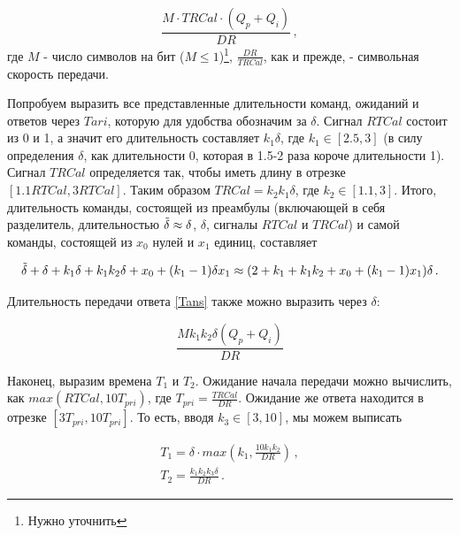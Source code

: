 \documentclass[12pt]{article}
\theoremstyle{definition}
\begin{document}
\begin{equation}
\label{Tans}
    \frac{M\cdot TRCal\cdot(Q_p+Q_i)}{DR}\,,
\end{equation}
где $M$ - число символов на бит ($M\leq1$)\footnote{Нужно уточнить}, $\frac{DR}{TRCal}$, как и прежде, - символьная скорость передачи.

Попробуем выразить все представленные длительности команд, ожиданий и ответов через $Tari$, которую для удобства обозначим за $\delta$. Сигнал $RTCal$ состоит из 0 и 1, а значит его длительность составляет $k_1\delta$, где $k_1\in[2.5,3]$ (в силу определения $\delta$, как длительности 0, которая в 1.5-2 раза короче длительности 1). Сигнал $TRCal$ определяется так, чтобы иметь длину в отрезке $[1.1RTCal,3RTCal]$. Таким образом $TRCal = k_2k_1\delta$, где $k_2\in[1.1,3]$. Итого, длительность команды, состоящей из преамбулы (включающей в себя разделитель, длительностью $\Tilde{\delta}\approx\delta$, $\delta$, сигналы $RTCal$ и $TRCal$) и самой команды, состоящей из $x_0$ нулей и $x_1$ единиц, составляет

\begin{equation}
    \Tilde{\delta}+\delta+k_1\delta+k_1k_2\delta+x_0+(k_1-1)\delta x_1 \approx (2+k_1+k_1k_2+x_0+(k_1-1)x_1)\delta\,.
\end{equation}

Длительность передачи ответа \eqref{Tans} также можно выразить через $\delta$:

\begin{equation}
    \frac{Mk_1k_2\delta(Q_p+Q_i)}{DR}
\end{equation}

Наконец, выразим времена $T_1$ и $T_2$. Ожидание начала передачи можно вычислить, как $max(RTCal,10T_{pri})$, где $T_{pri}=\frac{TRCal}{DR}$. Ожидание же ответа находится в отрезке $[3T_{pri},10T_{pri}]$. То есть, вводя $k_3\in[3,10]$, мы можем выписать

\begin{equation}
    \begin{gathered}
        T_1 = \delta\cdot max(k_1,\frac{10k_1k_2}{DR})\,, \\
        T_2 = \frac{k_1k_2k_3\delta}{DR}\,.
    \end{gathered}
\end{equation}
\end{document}
